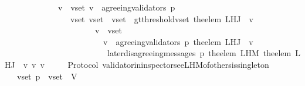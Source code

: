 \begin{isabellebody}
\ \ \ \ \ \ \ \ \ \ \ \ {\isacharparenleft}{\isasymforall}\ v\ {\isasymin}\ v{\isacharunderscore}set{\isachardot}\ v\ {\isasymin}\ agreeing{\isacharunderscore}validators\ {\isacharparenleft}p{\isacharcomma}\ {\isasymsigma}{\isacharparenright}\isanewline
\ \ \ \ \ \ \ \ \ \ \ \ \ \ {\isasymand}\ {\isacharparenleft}{\isasymexists}\ v{\isacharunderscore}set{\isacharprime}{\isachardot}\ v{\isacharunderscore}set{\isacharprime}\ {\isasymsubseteq}\ v{\isacharunderscore}set\ {\isasymand}\ gt{\isacharunderscore}threshold{\isacharparenleft}v{\isacharunderscore}set{\isacharprime}{\isacharcomma}\ the{\isacharunderscore}elem\ {\isacharparenleft}L{\isacharunderscore}H{\isacharunderscore}J\ {\isasymsigma}\ v{\isacharparenright}{\isacharparenright}\ \isanewline
\ \ \ \ \ \ \ \ \ \ \ \ \ \ \ \ \ \ \ \ {\isasymand}\ {\isacharparenleft}{\isasymforall}\ v{\isacharprime}\ {\isasymin}\ v{\isacharunderscore}set{\isacharprime}{\isachardot}\ \isanewline
\ \ \ \ \ \ \ \ \ \ \ \ \ \ \ \ \ \ \ \ \ \ \ \ v{\isacharprime}\ {\isasymin}\ agreeing{\isacharunderscore}validators\ {\isacharparenleft}p{\isacharcomma}\ {\isacharparenleft}the{\isacharunderscore}elem\ {\isacharparenleft}L{\isacharunderscore}H{\isacharunderscore}J\ {\isasymsigma}\ v{\isacharparenright}{\isacharparenright}{\isacharparenright}\isanewline
\ \ \ \ \ \ \ \ \ \ \ \ \ \ \ \ \ \ \ \ \ \ \ \ {\isasymand}\ later{\isacharunderscore}disagreeing{\isacharunderscore}messages\ {\isacharparenleft}p{\isacharcomma}\ the{\isacharunderscore}elem\ {\isacharparenleft}L{\isacharunderscore}H{\isacharunderscore}M\ {\isacharparenleft}the{\isacharunderscore}elem\ {\isacharparenleft}L{\isacharunderscore}H{\isacharunderscore}J\ {\isasymsigma}\ v{\isacharparenright}{\isacharparenright}\ v{\isacharprime}{\isacharparenright}{\isacharcomma}\ v{\isacharprime}{\isacharcomma}\ {\isasymsigma}{\isacharparenright}\ {\isacharequal}\ {\isasymemptyset}{\isacharparenright}{\isacharparenright}{\isacharparenright}{\isacharparenright}{\isachardoublequoteclose}\isanewline
\isanewline
{}\isamarkupfalse%
\ {\isacharparenleft}\ Protocol{\isacharparenright}\ validator{\isacharunderscore}in{\isacharunderscore}inspector{\isacharunderscore}see{\isacharunderscore}L{\isacharunderscore}H{\isacharunderscore}M{\isacharunderscore}of{\isacharunderscore}others{\isacharunderscore}is{\isacharunderscore}singleton\ {\isacharcolon}\ \isanewline
\ \ {\isachardoublequoteopen}{\isasymforall}\ v{\isacharunderscore}set\ p\ {\isasymsigma}{\isachardot}\ v{\isacharunderscore}set\ {\isasymsubseteq}\ V\ {\isasymand}\ {\isasymsigma}\ {\isasymin}\ {\isasymSigma}\ \isanewline

\end{isabellebody}

